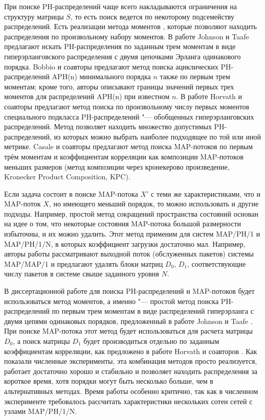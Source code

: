 При поиске PH-распределений чаще всего накладываются ограничения на структуру матрицы $S$, то есть поиск ведется по некоторому подсемейству распределений. Есть реализации метода моментов \cite{Johnson1989, Bobbio2005, Horvath2007, Horvath2013}, которые позволяют находить распределения по произвольному набору моментов. В работе Johnson и Taafe \cite{Johnson1989} предлагают искать PH-распределения по заданным трем моментам в виде гиперэрланговского распределения с двумя цепочками Эрланга одинакового порядка. Bobbio и соавторы \cite{Bobbio2005} предлагают метод поиска ациклических PH-распределений APH(n) минимального порядка $n$ также по первым трем моментам; кроме того, авторы описывают границы значений первых трех моментов для распределений APH(n) при известном $n$. В работе \cite{Horvath2013} Horvath и соавторы предлагают метод поиска по произвольному числу первых моментов специального подкласса PH-распределений "--- обобщенных гиперэрланговских распределений. Метод позволяет находить множество допустимых PH-распределений, из которых можно выбрать наиболее подходящее по той или иной метрике. Casale и соавторы \cite{Casale2010} предлагают метод поиска MAP-потоков по первым трём моментам и коэффициентам корреляции как композиции MAP-потоков меньших размеров (метод композиции через кронекерово произведение, Kronecker Product Composition, KPC).

Если задача состоит в поиске MAP-потока $X'$ с теми же характеристиками, что и MAP-поток $X$, но имеющего меньший порядок, то можно использовать и другие подходы. Например, простой метод сокращений пространства состояний основан на идее о том, что некоторые состояния MAP-потока большой размерности избыточны, и их можно удалить. Этот метод применим для систем MAP/PH/1 и MAP/PH/1/N, в которых коэффициент загрузки достаточно мал. Например, авторы работы \cite{Horvath2010} рассматривают выходной поток (обслуженных пакетов) системы MAP/MAP/1 и предлагают удалять блоки матриц $D_0,\,D_1$, соответствующие числу пакетов в системе свыше заданного уровня $N$.

В диссертационной работе для поиска PH-распределений и MAP-потоков будет использоваться метод моментов, а именно "--- простой метод поиска PH-распределений по первым трем моментам в виде распределений гиперэрланга с двумя цепями одинаковых порядков, предложенный в работе Johnson и Taafe \cite{Johnson1989}. При поиске MAP-потока этот метод будет использоваться для расчета матрицы $D_0$, а поиск матрицы $D_1$ будет производиться отдельно по заданным коэффициентам корреляции, как предложено в работе Horvath и соавторов \cite{Horvath2005}. Как показали численные эксперименты, эта комбинация методов просто реализуется, работает достаточно хорошо и стабильно и позволяет находить распределения за короткое время, хотя порядки могут быть несколько больше, чем в альтернативных методах. Время работы особенно критично, так как в численном эксперименте требовалось рассчитать характеристики нескольких сотен сетей с узлами MAP/PH/1/N.



